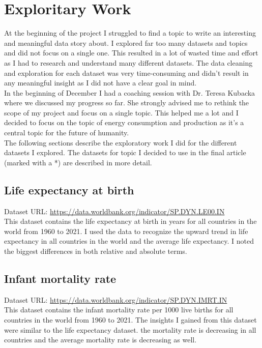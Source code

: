 \documentclass{article}
\begin{document}
\newpage

\section{Exploritary Work}
At the beginning of the project I struggled to find a topic to write an interesting and meaningful data story about.
I explored far too many datasets and topics and did not focus on a single one.
This resulted in a lot of wasted time and effort as I had to research and understand many different datasets.
The data cleaning and exploration for each dataset was very time-consuming and didn't result in any meaningful insight as I did not have a clear goal in mind. \\
In the beginning of December I had a coaching session with Dr. Teresa Kubacka where we discussed my progress so far.
She strongly advised me to rethink the scope of my project and focus on a single topic.
This helped me a lot and I decided to focus on the topic of energy consumption and production as it's a central topic for the future of humanity. \\
The following sections describe the exploratory work I did for the different datasets I explored.
The datasets for topic I decided to use in the final article (marked with a *) are described in more detail.

\subsection{Life expectancy at birth}

Dataset URL: \url{https://data.worldbank.org/indicator/SP.DYN.LE00.IN} \\
This dataset contains the life expectancy at birth in years for all countries in the world from 1960 to 2021.
I used the data to recognize the upward trend in life expectancy in all countries in the world and the average life expectancy.
I noted the biggest differences in both relative and absolute terms. 

\subsection{Infant mortality rate}

Dataset URL: \url{https://data.worldbank.org/indicator/SP.DYN.IMRT.IN} \\
This dataset contains the infant mortality rate per 1000 live births for all countries in the world from 1960 to 2021.
The insights I gained from this dataset were similar to the life expectancy dataset.
the mortality rate is decreasing in all countries and the average mortality rate is decreasing as well.
\end{document}
